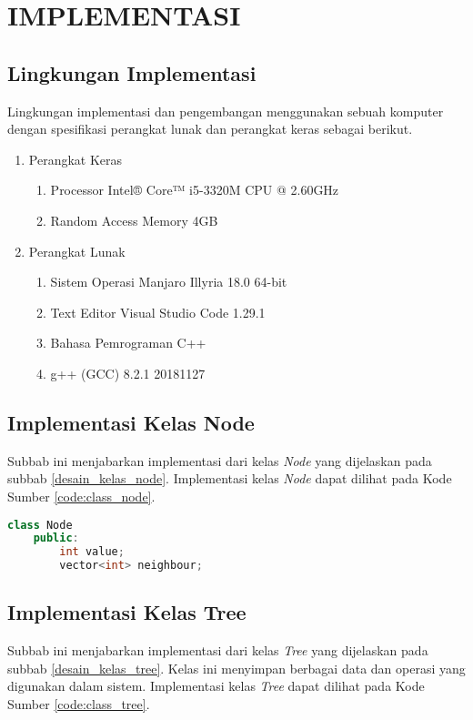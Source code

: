 \chapter {IMPLEMENTASI}

\section{Lingkungan Implementasi}

Lingkungan implementasi dan pengembangan menggunakan sebuah komputer dengan spesifikasi perangkat lunak dan perangkat keras sebagai berikut.

\begin{enumerate}
	\item Perangkat Keras
	\begin{enumerate}
		\item Processor Intel® Core™ i5-3320M CPU @ 2.60GHz
		\item Random Access Memory 4GB
	\end{enumerate}
	\item Perangkat Lunak
	\begin{enumerate}
		\item Sistem Operasi Manjaro Illyria 18.0 64-bit
		\item Text Editor Visual Studio Code 1.29.1
		\item Bahasa Pemrograman C++
		\item g++ (GCC) 8.2.1 20181127
	\end{enumerate}
\end{enumerate}

\section{Implementasi Kelas Node}
Subbab ini menjabarkan implementasi dari kelas \textit{Node} yang dijelaskan pada subbab \ref{desain_kelas_node}. Implementasi kelas \textit{Node} dapat dilihat pada Kode Sumber \ref{code:class_node}.

\begin{lstlisting}[language=C++, caption=Implementasi Kelas \textit{Node}, label=code:class_node, firstnumber=0]
	class Node
    public:
        int value;
        vector<int> neighbour;
\end{lstlisting}

\section{Implementasi Kelas Tree}
Subbab ini menjabarkan implementasi dari kelas \textit{Tree} yang dijelaskan pada subbab \ref{desain_kelas_tree}. Kelas ini menyimpan berbagai data dan operasi yang digunakan dalam sistem. Implementasi kelas \textit{Tree} dapat dilihat pada Kode Sumber \ref{code:class_tree}.

